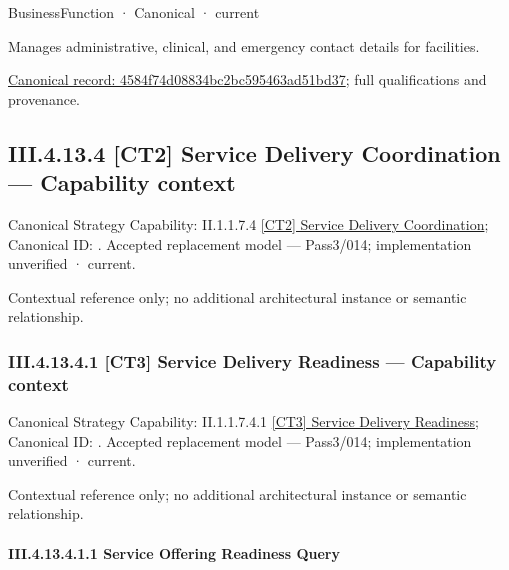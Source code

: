 \label{element:4584f74d08834bc2bc595463ad51bd37}
{\small BusinessFunction · Canonical · current}\par

Manages administrative, clinical, and emergency contact details for facilities.


{\footnotesize \href{../../../../../../../../continuum/business/business-function/4584f74d08834bc2bc595463ad51bd37.md}{Canonical record: 4584f74d08834bc2bc595463ad51bd37}; full qualifications and provenance.}\par
\subsection*{III.4.13.4 [CT2] Service Delivery Coordination — Capability context}
\label{navigation:III.4.13.4}

{\small Canonical Strategy Capability: II.1.1.7.4 \hyperref[element:5d3586334499415e94f38d3680834f47]{[CT2] Service Delivery Coordination}; Canonical ID: \texttt{}. Accepted replacement model — Pass3/014; implementation unverified · current.}\par
Contextual reference only; no additional architectural instance or semantic relationship.\par
\subsubsection*{III.4.13.4.1 [CT3] Service Delivery Readiness — Capability context}
\label{navigation:III.4.13.4.1}

{\small Canonical Strategy Capability: II.1.1.7.4.1 \hyperref[element:cfce47b7e3c1424eba10348f9eb7ea9c]{[CT3] Service Delivery Readiness}; Canonical ID: \texttt{}. Accepted replacement model — Pass3/014; implementation unverified · current.}\par
Contextual reference only; no additional architectural instance or semantic relationship.\par
\paragraph*{III.4.13.4.1.1 Service Offering Readiness Query}
\label{navigation:III.4.13.4.1.1}

